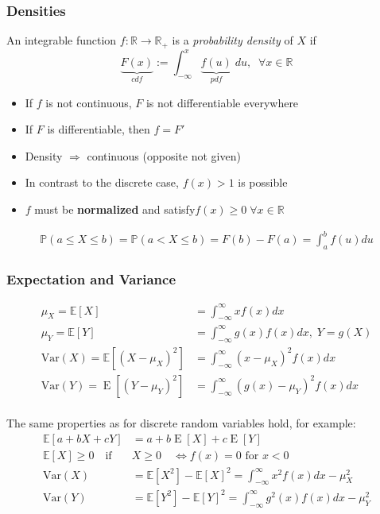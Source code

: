 \subsubsection{Densities}
An integrable function $f:\mathbb{R}\rightarrow\mathbb{R}_+$ is a \textit{probability density} of $X$ if
\noindent\begin{equation*}
    \underbrace{F(x)}_{cdf} := \int_{-\infty}^{x} \underbrace{f(u)}_{pdf}\; du,\;\; \forall x\in \mathbb{R}
\end{equation*}
\begin{itemize}
    \item If $f$ is not continuous, $F$ is not differentiable everywhere
    \item If $F$ is differentiable, then $f = F'$
    \item Density $\Rightarrow$ continuous (opposite not given)
    \item In contrast to the discrete case, $f(x)>1$ is possible
    \item $f$ must be \textbf{normalized} and satisfy\newline $f(x)\geq 0 \; \forall x\in\mathbb{R}$
\end{itemize}
\noindent\begin{align*}
    \mathbb{P}(a\leq X\leq b)=\mathbb{P}(a<X\leq b)=F(b)-F(a)=\int_a^b f(u)du
\end{align*}
\subsubsection{Expectation and Variance}
\noindent\begin{align*}
    \mu_X=\mathbb{E}[X]                                 & =\int_{-\infty}^{\infty}xf(x)dx                               \\
    \mu_Y=\mathbb{E}[Y]                                 & =\int_{-\infty}^{\infty}g(x)f(x)dx,\;Y=g(X)                   \\
    \mathrm{Var}(X)=\mathbb{E}[{(X-\mu_{X})}^{2}]       & =\int_{-\infty}^{\infty}{(x-\mu_{X})}^{2}f(x)dx               \\
    \mathrm{Var}(Y)=\operatorname{E}[{(Y-\mu_{Y})}^{2}] & =\int_{-\infty}^{\infty}{\left(g(x)-\mu_{Y}\right)}^{2}f(x)dx
\end{align*}
\\
The same properties as for discrete random variables hold, for example:
\noindent\begin{align*}
    \mathbb{E}[a+bX+cY]               & =a+b\operatorname{E}[X]+c\operatorname{E}[Y]                                             \\
    \mathbb{E}[X]\geq0\quad\text{if } & X\geq0\quad\Leftrightarrow f(x) = 0 \text{ for } x<0                                     \\
    \mathrm{Var}(X)                   & =\mathbb{E}[X^{2}]-{\mathbb{E}[X]}^{2}=\int_{-\infty}^{\infty}x^{2}f(x)dx-\mu_{X}^{2}    \\
    \mathrm{Var}(Y)                   & =\mathbb{E}[Y^{2}]-{\mathbb{E}[Y]}^{2}=\int_{-\infty}^{\infty}g^{2}(x)f(x)dx-\mu_{Y}^{2}
\end{align*}

